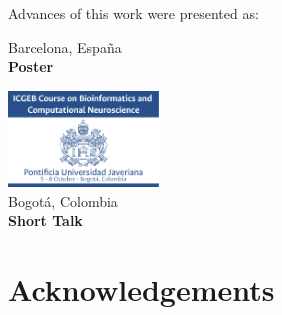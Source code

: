 \documentclass[11pt]{beamer}
\begin{document}
\begin{frame}{Advances of this work were presented as:}
\begin{multicols}{3}
\begin{center}
Barcelona, España\\
\textbf{Poster}
\end{center}
\begin{center}
\includegraphics[width=0.3\textwidth]{ICGEB}\\
Bogotá, Colombia\\
\textbf{Short Talk}
\end{center}
\end{multicols}
\end{frame}
\section{Acknowledgements}
\end{document}
